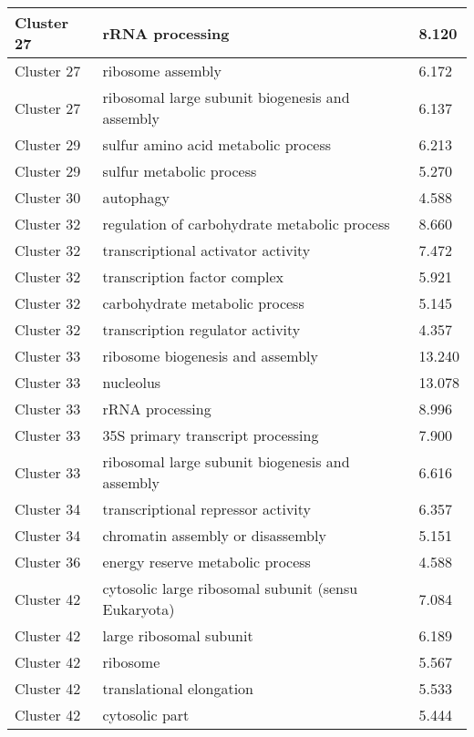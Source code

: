 \begin{longtable}{|p{1in}|p{4in}|p{1in}|}
Cluster 27 & rRNA processing & 8.120 \\ \hline
Cluster 27 & ribosome assembly & 6.172 \\ \hline
Cluster 27 & ribosomal large subunit biogenesis and assembly & 6.137 \\ \hline
Cluster 29 & sulfur amino acid metabolic process & 6.213 \\ \hline
Cluster 29 & sulfur metabolic process & 5.270 \\ \hline
Cluster 30 & autophagy & 4.588 \\ \hline
Cluster 32 & regulation of carbohydrate metabolic process & 8.660 \\ \hline
Cluster 32 & transcriptional activator activity & 7.472 \\ \hline
Cluster 32 & transcription factor complex & 5.921 \\ \hline
Cluster 32 & carbohydrate metabolic process & 5.145 \\ \hline
Cluster 32 & transcription regulator activity & 4.357 \\ \hline
Cluster 33 & ribosome biogenesis and assembly & 13.240 \\ \hline
Cluster 33 & nucleolus & 13.078 \\ \hline
Cluster 33 & rRNA processing & 8.996 \\ \hline
Cluster 33 & 35S primary transcript processing & 7.900 \\ \hline
Cluster 33 & ribosomal large subunit biogenesis and assembly & 6.616 \\ \hline
Cluster 34 & transcriptional repressor activity & 6.357 \\ \hline
Cluster 34 & chromatin assembly or disassembly & 5.151 \\ \hline
Cluster 36 & energy reserve metabolic process & 4.588 \\ \hline
Cluster 42 & cytosolic large ribosomal subunit (sensu Eukaryota) & 7.084 \\ \hline
Cluster 42 & large ribosomal subunit & 6.189 \\ \hline
Cluster 42 & ribosome & 5.567 \\ \hline
Cluster 42 & translational elongation & 5.533 \\ \hline
Cluster 42 & cytosolic part & 5.444 \\ \hline
\end{longtable}
